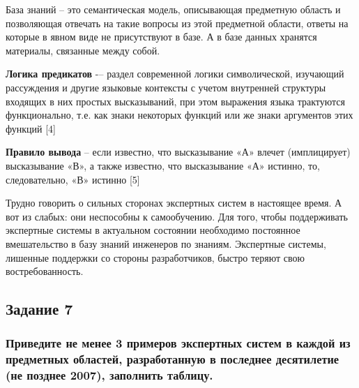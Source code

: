 \documentclass[14pt,a4paper,report]{report}
\begin{document}
База знаний -- это семантическая модель, описывающая предметную область и позволяющая отвечать на такие вопросы из этой предметной области, ответы на которые в явном виде не присутствуют в базе. А в базе данных хранятся материалы, связанные между собой. 

\textbf{Логика предикатов} -– раздел современной логики символической, изучающий рассуждения и другие языковые контексты с учетом внутренней структуры входящих в них простых высказываний, при этом выражения языка трактуются функционально, т.е. как знаки некоторых функций или же знаки аргументов этих функций [4]

\textbf{Правило вывода} -- если известно, что высказывание «А» влечет (имплицирует) высказывание «В», а также известно, что высказывание «А» истинно, то, следовательно, «В» истинно [5]

Трудно говорить о сильных сторонах экспертных систем в настоящее время. А вот из слабых: они неспособны к самообучению. Для того, чтобы поддерживать экспертные системы в актуальном состоянии необходимо постоянное вмешательство в базу знаний инженеров по знаниям. Экспертные системы, лишенные поддержки со стороны разработчиков, быстро теряют свою востребованность.


\clearpage

\subsection{Задание 7}

\subsubsection{Приведите не менее 3 примеров экспертных систем в каждой из предметных областей, разработанную в последнее десятилетие (не позднее 2007), заполнить таблицу.}
\end{document}
